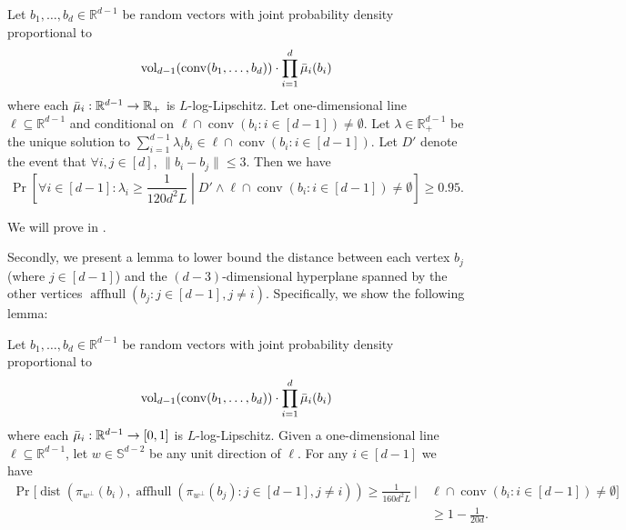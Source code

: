 \documentclass{article}\usepackage[a4paper,margin=20mm]{geometry}
\newcommand{\R}{\mathbb R}
\newcommand{\aff}{\operatorname{affhull}}
\newcommand{\conv}{\operatorname{conv}}
\newcommand{\dist}{\operatorname{dist}}
\newcommand{\vol}{\operatorname{vol}}
\renewcommand{\subset}{\subseteq}
\begin{document}
\begin{lemma}\label{lem:ridge-lambda-lb}
    Let $b_1,\ldots,b_d \in \R^{d-1}$ be random vectors with joint probability density proportional
    to
    \[
    \vol_{d-1}(\conv(b_1, \ldots, b_d)) \cdot \prod_{i=1}^d \Bar{\mu}_i(b_i)
    \]
    where each $\Bar\mu_i : \R^{d-1} \to \R_+$ is $L$-log-Lipschitz.
    Let one-dimensional line $\ell \subset \R^{d-1}$ and conditional on $\ell \cap \conv(b_i : i\in [d-1]) \neq \emptyset$.
    Let $\lambda \in \R^{d-1}_+$ be the unique solution to $\sum_{i=1}^{d-1} \lambda_i b_i \in \ell \cap \conv(b_i : i\in [d-1])$.
    Let $D'$ denote the event that $\forall i, j \in [d]$, $\|b_i - b_j\| \leq 3$.
    Then we have
    \[
    \Pr\left[ \forall i \in [d-1] : \lambda_i \geq \frac{1}{120d^2 L} \middle| D' \wedge \ell \cap \conv(b_i : i\in [d-1]) \neq \emptyset \right] \geq 0.95.
    \]
\end{lemma}
We will prove  in .

Secondly, we present a lemma to lower bound the distance between each vertex $b_j$ (where $j \in [d-1]$) and the $(d-3)$-dimensional hyperplane spanned by the other vertices $\aff(b_j : j \in [d-1], j\neq i)$. Specifically, we show the following lemma:

\begin{lemma}\label{lem:facet-distance-lb}
   Let $b_1,\ldots,b_d \in \R^{d-1}$ be random vectors with joint probability density proportional to
    \[
    \vol_{d-1}(\conv(b_1, \ldots, b_d)) \cdot \prod_{i=1}^d \Bar{\mu}_i(b_i)
    \]
    where each $\Bar\mu_i : \R^{d-1} \to [0, 1]$ is $L$-log-Lipschitz.
    Given a one-dimensional line $\ell \subset \R^{d-1}$, let $w \in \mathbb{S}^{d-2}$ be any unit direction of $\ell$.
    For any $i \in [d-1]$ we have
    \begin{align*}
        \Pr\Big[ \dist \left( \pi_{w^\perp}(b_i), \aff(\pi_{w^\perp}(b_j) : j \in [d-1], j \neq i) \right) \geq \frac{1}{160 d^2L} ~\Big|~
        & \ell \cap \conv(b_i : i\in [d-1]) \neq \emptyset \Big] \\
        &\geq 1-\frac{1}{20d}.
    \end{align*}
\end{lemma}
\end{document}
